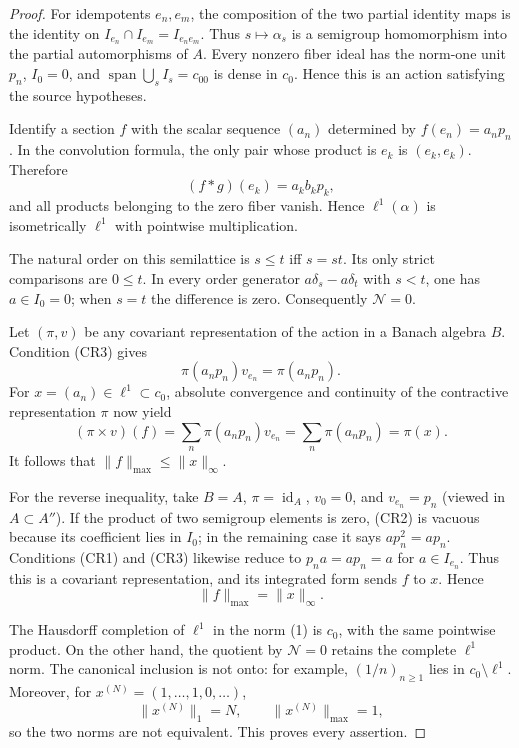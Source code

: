 \documentclass[10pt]{article}
\newcommand{\Null}{\mathcal N}
\begin{document}
\begin{proof}
For idempotents $e_n,e_m$, the composition of the two partial identity maps
is the identity on
$I_{e_n}\cap I_{e_m}=I_{e_ne_m}$.  Thus $s\mapsto\alpha_s$ is a semigroup
homomorphism into the partial automorphisms of $A$.  Every nonzero fiber ideal
has the norm-one unit $p_n$, $I_0=0$, and
$\operatorname{span}\bigcup_sI_s=c_{00}$ is dense in $c_0$.  Hence this is an
action satisfying the source hypotheses.

Identify a section $f$ with the scalar sequence $(a_n)$ determined by
$f(e_n)=a_np_n$.  In the convolution formula, the only pair whose product is
$e_k$ is $(e_k,e_k)$.  Therefore
\[
 (f*g)(e_k)=a_kb_kp_k,
\]
and all products belonging to the zero fiber vanish.  Hence
$\ell^1(\alpha)$ is isometrically $\ell^1$ with pointwise multiplication.

The natural order on this semilattice is $s\leq t$ iff $s=st$.  Its only
strict comparisons are $0\leq t$.  In every order generator
$a\delta_s-a\delta_t$ with $s<t$, one has $a\in I_0=0$; when $s=t$ the
difference is zero.  Consequently $\Null=0$.

Let $(\pi,v)$ be any covariant representation of the action in a Banach
algebra $B$.  Condition (CR3) gives
\[
 \pi(a_np_n)v_{e_n}=\pi(a_np_n).
\]
For $x=(a_n)\in\ell^1\subset c_0$, absolute convergence and continuity of
the contractive representation $\pi$ now yield
\[
 (\pi\mathbin{\times}v)(f)
 =\sum_n\pi(a_np_n)v_{e_n}
 =\sum_n\pi(a_np_n)=\pi(x).
\]
It follows that $\|f\|_{\max}\leq\|x\|_\infty$.

For the reverse inequality, take $B=A$, $\pi=\operatorname{id}_A$,
$v_0=0$, and $v_{e_n}=p_n$ (viewed in $A\subset A''$).  If the product of
two semigroup elements is zero, (CR2) is vacuous because its coefficient lies
in $I_0$; in the remaining case it says $ap_n^2=ap_n$.  Conditions (CR1) and
(CR3) likewise reduce to $p_na=ap_n=a$ for $a\in I_{e_n}$.  Thus this is a
covariant representation, and its integrated form sends $f$ to $x$.  Hence
\[
 \|f\|_{\max}=\|x\|_\infty.                         \tag{1}
\]

The Hausdorff completion of $\ell^1$ in the norm (1) is $c_0$, with the same
pointwise product.  On the other hand, the quotient by $\Null=0$ retains the
complete $\ell^1$ norm.  The canonical inclusion is not onto: for example,
$(1/n)_{n\ge1}$ lies in $c_0\setminus\ell^1$.  Moreover, for
$x^{(N)}=(1,\ldots,1,0,\ldots)$,
\[
 \|x^{(N)}\|_1=N,\qquad \|x^{(N)}\|_{\max}=1,
\]
so the two norms are not equivalent.  This proves every assertion.
\end{proof}
\end{document}
